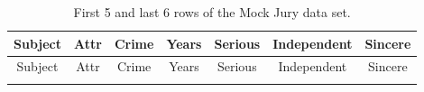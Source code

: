 \documentclass[]{book}
\theoremstyle{definition}
\theoremstyle{definition}
\theoremstyle{remark}
\begin{document}
\begin{longtable}[]{@{}ccccccc@{}}
\caption{\label{tab:Table2-1} First 5 and last 6 rows of the Mock Jury data set.}\tabularnewline
\toprule
\begin{minipage}[b]{0.11\columnwidth}\centering\strut
Subject\strut
\end{minipage} & \begin{minipage}[b]{0.11\columnwidth}\centering\strut
Attr\strut
\end{minipage} & \begin{minipage}[b]{0.10\columnwidth}\centering\strut
Crime\strut
\end{minipage} & \begin{minipage}[b]{0.09\columnwidth}\centering\strut
Years\strut
\end{minipage} & \begin{minipage}[b]{0.11\columnwidth}\centering\strut
Serious\strut
\end{minipage} & \begin{minipage}[b]{0.16\columnwidth}\centering\strut
Independent\strut
\end{minipage} & \begin{minipage}[b]{0.10\columnwidth}\centering\strut
Sincere\strut
\end{minipage}\tabularnewline
\midrule
\endfirsthead
\toprule
\begin{minipage}[b]{0.11\columnwidth}\centering\strut
Subject\strut
\end{minipage} & \begin{minipage}[b]{0.11\columnwidth}\centering\strut
Attr\strut
\end{minipage} & \begin{minipage}[b]{0.10\columnwidth}\centering\strut
Crime\strut
\end{minipage} & \begin{minipage}[b]{0.09\columnwidth}\centering\strut
Years\strut
\end{minipage} & \begin{minipage}[b]{0.11\columnwidth}\centering\strut
Serious\strut
\end{minipage} & \begin{minipage}[b]{0.16\columnwidth}\centering\strut
Independent\strut
\end{minipage} & \begin{minipage}[b]{0.10\columnwidth}\centering\strut
Sincere\strut
\end{minipage}\tabularnewline
\midrule
\endhead
\begin{minipage}[t]{0.11\columnwidth}\centering\strut

\end{minipage}
\end{longtable}
\end{document}
